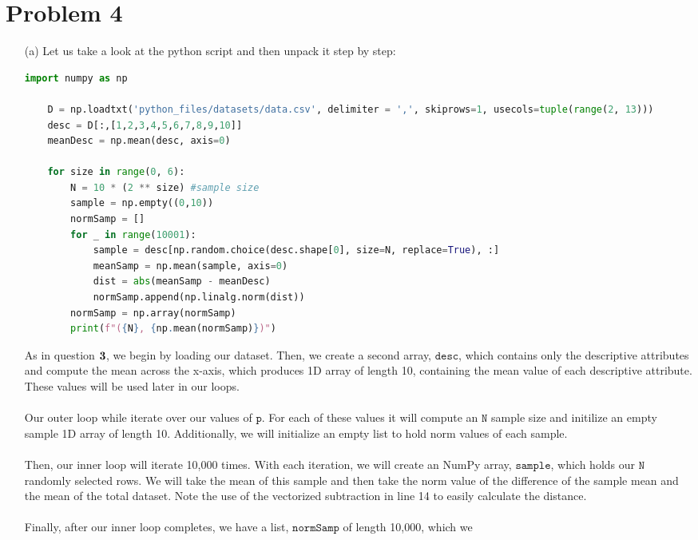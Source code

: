 \documentclass[12pt, letterpaper]{article}
\begin{document}
\section*{Problem 4}
\begin{enumerate}
    \item [(a)] Let us take a look at the python script and then unpack it step by step:
\begin{lstlisting}[language=python]
    import numpy as np

    D = np.loadtxt('python_files/datasets/data.csv', delimiter = ',', skiprows=1, usecols=tuple(range(2, 13)))
    desc = D[:,[1,2,3,4,5,6,7,8,9,10]]
    meanDesc = np.mean(desc, axis=0)
    
    for size in range(0, 6):
        N = 10 * (2 ** size) #sample size
        sample = np.empty((0,10))
        normSamp = []
        for _ in range(10001):
            sample = desc[np.random.choice(desc.shape[0], size=N, replace=True), :]
            meanSamp = np.mean(sample, axis=0)
            dist = abs(meanSamp - meanDesc)
            normSamp.append(np.linalg.norm(dist))
        normSamp = np.array(normSamp)
        print(f"({N}, {np.mean(normSamp)})")
\end{lstlisting}
    As in question ${\bf 3}$, we begin by loading our dataset. Then, we create a second array, 
    $\texttt{desc}$, which contains only the descriptive attributes and compute the mean across 
    the x-axis, which produces 1D array of length 10, containing the mean value of each descriptive 
    attribute. These values will be used later in our loops. \\ \\
    Our outer loop while iterate over our values of $\texttt{p}$. For each of these values it will 
    compute an $\texttt{N}$ sample size and initilize an empty sample 1D array of length 10. Additionally, 
    we will initialize an empty list to hold norm values of each sample. \\ \\
    Then, our inner loop will iterate 10,000 times. With each iteration, we will create an NumPy array, 
    $\texttt{sample}$, which holds our $\texttt{N}$ randomly selected rows. We will take the mean of this 
    sample and then take the norm value of the difference of the sample mean and the mean of the total dataset. 
    Note the use of the vectorized subtraction in line 14 to easily calculate the distance. \\ \\
    Finally, after our inner loop completes, we have a list, $\texttt{normSamp}$ of length 10,000, which we

\end{enumerate}
\end{document}
